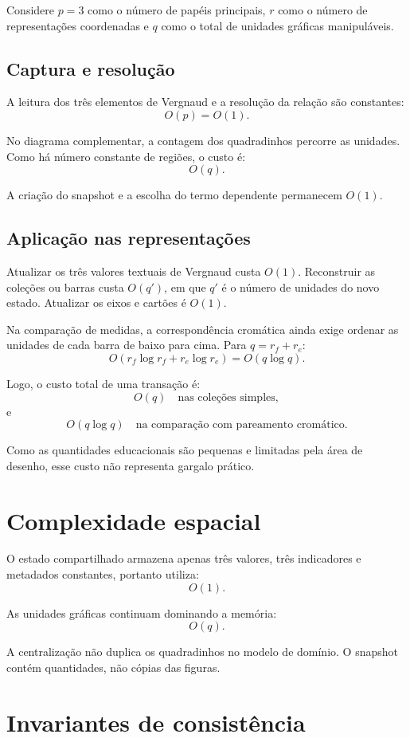 \documentclass[12pt,a4paper]{article}
\begin{document}
Considere $p=3$ como o número de papéis principais, $r$ como o número de representações coordenadas e $q$ como o total de unidades gráficas manipuláveis.

\subsection{Captura e resolução}

A leitura dos três elementos de Vergnaud e a resolução da relação são constantes:
\[
O(p)=O(1).
\]

No diagrama complementar, a contagem dos quadradinhos percorre as unidades. Como há número constante de regiões, o custo é:
\[
O(q).
\]

A criação do snapshot e a escolha do termo dependente permanecem $O(1)$.

\subsection{Aplicação nas representações}

Atualizar os três valores textuais de Vergnaud custa $O(1)$. Reconstruir as coleções ou barras custa $O(q')$, em que $q'$ é o número de unidades do novo estado. Atualizar os eixos e cartões é $O(1)$.

Na comparação de medidas, a correspondência cromática ainda exige ordenar as unidades de cada barra de baixo para cima. Para $q=r_f+r_e$:
\[
O(r_f\log r_f+r_e\log r_e)=O(q\log q).
\]

Logo, o custo total de uma transação é:
\[
O(q) \quad \text{nas coleções simples},
\]
e
\[
O(q\log q) \quad \text{na comparação com pareamento cromático}.
\]

Como as quantidades educacionais são pequenas e limitadas pela área de desenho, esse custo não representa gargalo prático.

\section{Complexidade espacial}

O estado compartilhado armazena apenas três valores, três indicadores e metadados constantes, portanto utiliza:
\[
O(1).
\]

As unidades gráficas continuam dominando a memória:
\[
O(q).
\]

A centralização não duplica os quadradinhos no modelo de domínio. O snapshot contém quantidades, não cópias das figuras.

\section{Invariantes de consistência}
\end{document}
